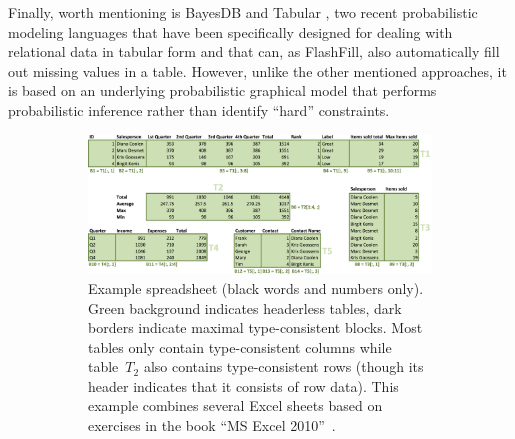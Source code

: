 Finally, worth mentioning is BayesDB \cite{BayesDB} and Tabular \cite{tabular}, two recent probabilistic modeling languages that have been specifically designed for dealing with relational data in tabular form and that can, as FlashFill, also automatically fill out missing values in a table.  However, unlike the other mentioned approaches, it is based on an underlying probabilistic graphical model that performs probabilistic inference rather than identify ``hard'' constraints.


\begin{figure}[thb]

  \begin{subfigure}{1\textwidth}
  \begin{center}
    \includegraphics[width=1\textwidth]{figures/Demo2.png}
  \end{center}
  \vspace{-10pt}
  \caption{
    Example spreadsheet (black words and numbers only).
    Green background indicates headerless tables, dark borders indicate maximal type-consistent blocks.
    Most tables only contain type-consistent columns while table~$T_2$ also contains type-consistent rows (though its header indicates that it consists of row data).
    This example combines several Excel sheets based on exercises in the book ``MS Excel 2010''~\cite{excel_book}.
  }
  \label{fig:main_example}
\end{subfigure}
\hfill
\begin{subfigure}{1\textwidth}
  {\scriptsize
    \begin{align*}
%

\end{align*}}
\end{subfigure}
\end{figure}

